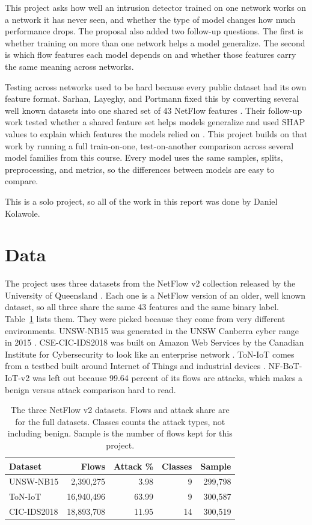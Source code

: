 \documentclass[10pt,twocolumn,letterpaper]{article}
\begin{document}
This project asks how well an intrusion detector trained on one network works on a network it has never seen, and whether the type of model changes how much performance drops. The proposal also added two follow-up questions. The first is whether training on more than one network helps a model generalize. The second is which flow features each model depends on and whether those features carry the same meaning across networks.

Testing across networks used to be hard because every public dataset had its own feature format. Sarhan, Layeghy, and Portmann fixed this by converting several well known datasets into one shared set of 43 NetFlow features \cite{sarhan2022}. Their follow-up work tested whether a shared feature set helps models generalize and used SHAP values to explain which features the models relied on \cite{sarhan2022bdr}. This project builds on that work by running a full train-on-one, test-on-another comparison across several model families from this course. Every model uses the same samples, splits, preprocessing, and metrics, so the differences between models are easy to compare.

This is a solo project, so all of the work in this report was done by Daniel Kolawole.

\section{Data}

The project uses three datasets from the NetFlow v2 collection released by the University of Queensland \cite{sarhan2022}. Each one is a NetFlow version of an older, well known dataset, so all three share the same 43 features and the same binary label. Table~\ref{tab:data} lists them. They were picked because they come from very different environments. UNSW-NB15 was generated in the UNSW Canberra cyber range in 2015 \cite{moustafa2015}. CSE-CIC-IDS2018 was built on Amazon Web Services by the Canadian Institute for Cybersecurity to look like an enterprise network \cite{sharafaldin2018}. ToN-IoT comes from a testbed built around Internet of Things and industrial devices \cite{moustafa2021}. NF-BoT-IoT-v2 was left out because 99.64 percent of its flows are attacks, which makes a benign versus attack comparison hard to read.

\begin{table}[t]
\centering
\small
\begin{tabular}{lrrrr}
\toprule
Dataset & Flows & Attack \% & Classes & Sample \\
\midrule
UNSW-NB15 & 2,390,275 & 3.98 & 9 & 299,798 \\
ToN-IoT & 16,940,496 & 63.99 & 9 & 300,587 \\
CIC-IDS2018 & 18,893,708 & 11.95 & 14 & 300,519 \\
\bottomrule
\end{tabular}
\caption{The three NetFlow v2 datasets. Flows and attack share are for the full datasets. Classes counts the attack types, not including benign. Sample is the number of flows kept for this project.}
\label{tab:data}
\end{table}
\end{document}
